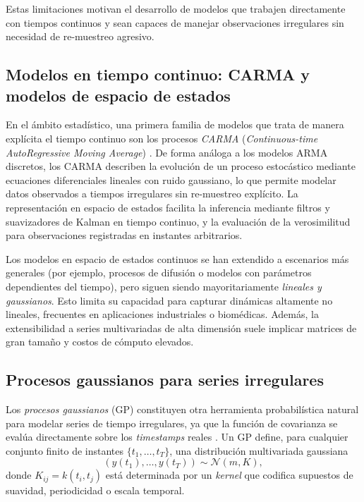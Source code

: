 Estas limitaciones motivan el desarrollo de modelos que trabajen directamente con tiempos continuos y sean capaces de manejar observaciones irregulares sin necesidad de re-muestreo agresivo.

\subsection{Modelos en tiempo continuo: CARMA y modelos de espacio de estados}

En el ámbito estadístico, una primera familia de modelos que trata de manera explícita el tiempo continuo son los procesos \textit{CARMA} (\emph{Continuous-time AutoRegressive Moving Average}) \cite{brockwell2001continuous,brockwell2001levy}. De forma análoga a los modelos ARMA discretos, los CARMA describen la evolución de un proceso estocástico mediante ecuaciones diferenciales lineales con ruido gaussiano, lo que permite modelar datos observados a tiempos irregulares sin re-muestreo explícito. La representación en espacio de estados facilita la inferencia mediante filtros y suavizadores de Kalman en tiempo continuo, y la evaluación de la verosimilitud para observaciones registradas en instantes arbitrarios.

\hfill

Los modelos en espacio de estados continuos se han extendido a escenarios más generales (por ejemplo, procesos de difusión o modelos con parámetros dependientes del tiempo), pero siguen siendo mayoritariamente \textit{lineales y gaussianos}. Esto limita su capacidad para capturar dinámicas altamente no lineales, frecuentes en aplicaciones industriales o biomédicas. Además, la extensibilidad a series multivariadas de alta dimensión suele implicar matrices de gran tamaño y costos de cómputo elevados.

\subsection{Procesos gaussianos para series irregulares}

Los \textit{procesos gaussianos} (GP) constituyen otra herramienta probabilística natural para modelar series de tiempo irregulares, ya que la función de covarianza se evalúa directamente sobre los \emph{timestamps} reales \cite{williams2006gaussian}. Un GP define, para cualquier conjunto finito de instantes $\{t_1,\dots,t_T\}$, una distribución multivariada gaussiana
\[
    (y(t_1),\dots,y(t_T)) \sim \mathcal{N}(m, K),
\]
donde $K_{ij} = k(t_i,t_j)$ está determinada por un \emph{kernel} que codifica supuestos de suavidad, periodicidad o escala temporal.

